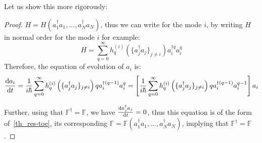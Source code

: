 Let us show this more rigorously:
\begin{proof}
    $H = H\left(a^\dagger_1 a_1, ..., a^\dagger_N a_N\right)$, thus we can write for the mode $i$, by writing $H$ in normal order for the mode $i$ for example:
    \begin{equation}
        H = \sum_{q=0}^\infty h^{(i)}_q\left(\{a^\dagger_j a_j\}_{j \neq i}\right) a_i^{\dagger q} a_i^q
    \end{equation}
    Therefore, the equation of evolution of $a_i$ is:
    \begin{equation}
        \dv{a_i}{t} = \frac{1}{i \hbar} \sum_{q=0}^\infty h^{(i)}_q\left(\{a^\dagger_j a_j\}_{j \neq i}\right) q a_i^{\dagger (q-1)} a_i^q = \left[\frac{1}{i \hbar} \sum_{q=0}^\infty h^{(i)}_q\left(\{a^\dagger_j a_j\}_{j \neq i}\right) q a_i^{\dagger (q-1)} a_i^{q-1}\right] a_i
    \end{equation}

    Further, using that $\mathbb{F}^\dagger = \mathbb{F}$, we have $\dv{a^\dagger_j a_j}{t} = 0$, thus 
    this equation is of the form of~\autoref{th_res-toe}, its corresponding $\mathbb{F} = \mathbb{F}\left(a^\dagger_1 a_1, ..., a^\dagger_N a_N\right)$, implying that $\mathbb{F}^\dagger = \mathbb{F}$.
\end{proof}
